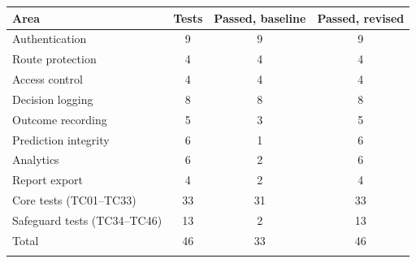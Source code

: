 \begin{tabular}{@{}lccc@{}}
\toprule
Area & Tests & Passed, baseline & Passed, revised\\
\midrule
Authentication & 9 & 9 & 9\\
Route protection & 4 & 4 & 4\\
Access control & 4 & 4 & 4\\
Decision logging & 8 & 8 & 8\\
Outcome recording & 5 & 3 & 5\\
Prediction integrity & 6 & 1 & 6\\
Analytics & 6 & 2 & 6\\
Report export & 4 & 2 & 4\\
\midrule
Core tests (TC01--TC33) & 33 & 31 & 33\\
Safeguard tests (TC34--TC46) & 13 & 2 & 13\\
Total & 46 & 33 & 46\\
\botrule
\end{tabular}
